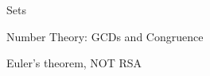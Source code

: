 \documentclass[quiz]{mcs}
\begin{document}

\examspace



\begin{staffnotes}
\begin{center}
{\large Sets}
\end{center}
\end{staffnotes}


\examspace

%
%
%
%


\begin{staffnotes}
\begin{center}
{\large Number Theory: GCDs and Congruence}
\end{center}
\end{staffnotes}




\examspace

%
%

\begin{staffnotes}
\begin{center}
{\large Euler's theorem, NOT RSA}
\end{center}
\end{staffnotes}
\end{document}
